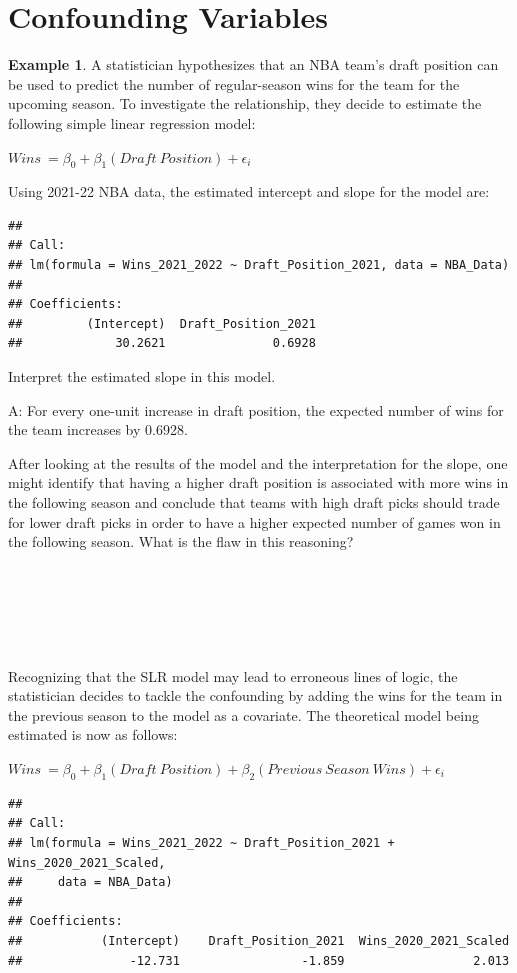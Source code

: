 \documentclass[
  11pt,
]{book}
\theoremstyle{definition}
\theoremstyle{definition}
\newtheorem{example}{Example}[chapter]
\theoremstyle{definition}
\theoremstyle{definition}
\theoremstyle{remark}
\begin{document}
\hypertarget{confounding-variables}{%
\section{Confounding Variables}\label{confounding-variables}}

\begin{example}
A statistician hypothesizes that an NBA team's draft position can be used to predict the number of regular-season wins for the team for the upcoming season. To investigate the relationship, they decide to estimate the following simple linear regression model:

\(Wins\ = \beta_0 + \beta_1(Draft\ Position) + \epsilon_i\)

Using 2021-22 NBA data, the estimated intercept and slope for the model are:

\begin{verbatim}
## 
## Call:
## lm(formula = Wins_2021_2022 ~ Draft_Position_2021, data = NBA_Data)
## 
## Coefficients:
##         (Intercept)  Draft_Position_2021  
##             30.2621               0.6928
\end{verbatim}

Interpret the estimated slope in this model.
\end{example}

A: For every one-unit increase in draft position, the expected number of wins for the team increases by 0.6928.

After looking at the results of the model and the interpretation for the slope, one might identify that having a higher draft position is associated with more wins in the following season and conclude that teams with high draft picks should trade for lower draft picks in order to have a higher expected number of games won in the following season. What is the flaw in this reasoning?

\(~\)

\(~\)

\(~\)

Recognizing that the SLR model may lead to erroneous lines of logic, the statistician decides to tackle the confounding by adding the wins for the team in the previous season to the model as a covariate. The theoretical model being estimated is now as follows:

\(Wins\ = \beta_0 + \beta_1(Draft\ Position) + \beta_2(Previous\ Season\ Wins) + \epsilon_i\)

\begin{verbatim}
## 
## Call:
## lm(formula = Wins_2021_2022 ~ Draft_Position_2021 + Wins_2020_2021_Scaled, 
##     data = NBA_Data)
## 
## Coefficients:
##           (Intercept)    Draft_Position_2021  Wins_2020_2021_Scaled  
##               -12.731                 -1.859                  2.013
\end{verbatim}
\end{document}
